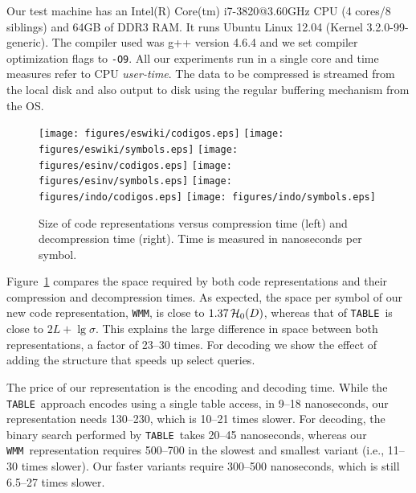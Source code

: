 \documentclass[preprint,12pt]{elsarticle}
\newcommand{\wmm}{\texttt{WMM}}
\newcommand{\tablen}{\texttt{TABLE}}
\begin{document}
Our test machine has an Intel(R) Core(tm) i7-3820@3.60GHz CPU (4 cores/8 siblings) and 64GB of DDR3 RAM.
It runs Ubuntu Linux 12.04 (Kernel 3.2.0-99-generic). The compiler used was g++ version 4.6.4 and we
set compiler optimization flags to \texttt{-O9}. All our experiments run in a single core and time measures
refer to CPU {\em user-time}. The data to be compressed is streamed from the local disk and also output to disk using the regular buffering mechanism from the OS.

  \begin{figure}[htbp]
  \begin{center}

  \texttt{[image: figures/eswiki/codigos.eps]}
  \texttt{[image: figures/eswiki/symbols.eps]}
  \texttt{[image: figures/esinv/codigos.eps]}
  \texttt{[image: figures/esinv/symbols.eps]}
  \texttt{[image: figures/indo/codigos.eps]}
  \texttt{[image: figures/indo/symbols.eps]}
  \end{center}
  \vspace{-0.3cm}
  \caption{Size of code representations versus compression time (left) and decompression time (right).
  Time is measured in nanoseconds per symbol.}
  \label{fig:exp.enc.dec}

  \end{figure}

Figure~\ref{fig:exp.enc.dec} compares the space required by both
code representations and their compression and decompression times.
As expected, the space per symbol of our new code representation, \wmm, is
close to $1.37\, \mathcal{H}_0(D)$, whereas that of \tablen\ is close to $2L+\lg\sigma$.
This explains the large difference in space between both representations,
a factor of 23--30 times. For decoding we show the effect of adding the
structure that speeds up select queries.

The price of our representation is the encoding and decoding time. While the
\tablen\ approach encodes using a single table access, in 9--18 nanoseconds,
our representation needs 130--230, which is 10--21 times slower. For
decoding, the binary search performed by \tablen\ takes 20--45 nanoseconds,
whereas our \wmm\ representation requires 500--700 in the slowest and smallest
variant (i.e., 11--30 times slower). Our faster variants require 300--500
nanoseconds, which is still 6.5--27 times slower.
\end{document}
